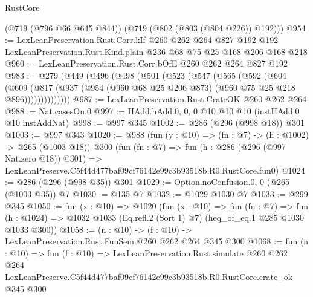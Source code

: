 \begin{lexlean}{RustCore}
\begin{coremodule}
      (@719 (@796 @66 @645 @844))
      (@719 (@802 (@803 (@804 @226)) @192)))
@954 := LexLeanPreservation.Rust.Corr.kIf
    @260
    @262
    @264
    @827
    @192
    @192
    LexLeanPreservation.Rust.Kind.plain
    @236
    @68
    @75
    @25
    @168
    @206
    @168
    @218
@960 := LexLeanPreservation.Rust.Corr.bOfE @260 @262 @264 @827 @192
@983 := @279
    (@449
      (@496
        (@498
          (@501
            (@523
              (@547
                (@565
                  (@592
                    (@604
                      (@609
                        (@817
                          (@937 (@954 (@960 @68 @25 @206 @873) (@960 @75 @25 @218 @896))))))))))))))
@987 := LexLeanPreservation.Rust.CrateOK @260 @262 @264
@988 := Nat.casesOn.{0}
@997 := HAdd.hAdd.{0, 0, 0} @10 @10 @10 (instHAdd.{0} @10 instAddNat)
@998 := @997 @345
@1002 := @286 (@296 (@998 @18)) @301
@1003 := @997 @343
@1020 := @988
    (fun (y : @10) => (fn : @7) -> (h : @1002) -> @265 (@1003 @18))
    @300
    (fun (fn : @7) =>
    fun (h : @286 (@296 (@997 Nat.zero @18)) @301) =>
    LexLeanPreserve.C5f44d477baf09cf76142e99c3b93518b.R0.RustCore.fun0)
@1024 := @286 (@296 (@998 @35)) @301
@1029 := Option.noConfusion.{0, 0} (@265 (@1003 @35)) @7
@1030 := @135 @7
@1032 := @1029 @1030 @7
@1033 := @299 @345
@1050 := fun (x : @10) =>
  @1020
    (fun (x : @10) =>
    fun (fn : @7) =>
    fun (h : @1024) => @1032 @1033 (Eq.refl.{2} (Sort 1) @7) (heq_of_eq.{1} @285 @1030 @1033 @300))
@1058 := (n : @10) -> (f : @10) -> LexLeanPreservation.Rust.FunSem @260 @262 @264 @345 @300
@1068 := fun (n : @10) =>
  fun (f : @10) =>
  LexLeanPreservation.Rust.simulate
    @260
    @262
    @264
    LexLeanPreserve.C5f44d477baf09cf76142e99c3b93518b.R0.RustCore.crate_ok
    @345
    @300
\end{coremodule}
\end{lexlean}

